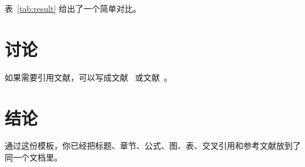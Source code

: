 \documentclass[12pt,a4paper]{ctexart} %
\begin{document}
表~\ref{tab:result} 给出了一个简单对比。 %

\section{讨论} %
如果需要引用文献，可以写成文献~\cite{lamport1994latex} 或文献~\cite{knuth1984texbook}。

\section{结论} %
通过这份模板，你已经把标题、章节、公式、图、表、交叉引用和参考文献放到了同一个文档里。

\printbibliography %
\end{document}
